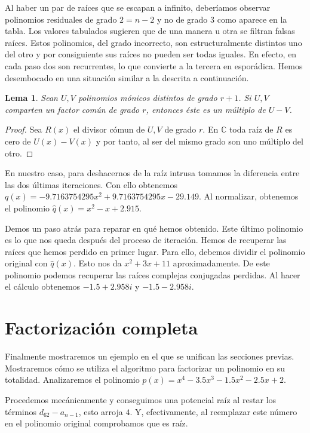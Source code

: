 \documentclass[oneside,11pt]{book}
\theoremstyle{definition}
\theoremstyle{plain}
\newtheorem{lemma}[counter]{Lema}
\theoremstyle{remark}
\begin{document}
Al haber un par de ra\'ices que se escapan a infinito, 
deber\'iamos observar polinomios residuales de grado $2=n-2$ y no de grado $3$ como aparece en la tabla. 
Los valores tabulados sugieren que de una manera u otra se filtran falsas ra\'ices.  
Estos polinomios, del grado incorrecto, son estructuralmente distintos uno del otro y por consiguiente 
sus ra\'ices no pueden ser todas iguales. 
En efecto, en cada paso dos son recurrentes, lo que convierte a la tercera en espor\'adica. 
Hemos desembocado en una situaci\'on similar a la descrita a continuaci\'on. 

\begin{lemma}
Sean $U,V$ polinomios m\'onicos distintos de grado $r+1$. 
Si $U,V$ comparten un factor com\'un de grado $r$, entonces \'este es un m\'ultiplo de $U-V$. 
\end{lemma}
\begin{proof}
Sea $R(x)$ el divisor c\'omun de $U,V$ de grado $r$. 
En $\mathbb C$ toda ra\'iz de $R$ es cero de $U(x)-V(x)$ y por tanto, 
al ser del mismo grado son uno m\'ultiplo del otro. 
\end{proof}

En nuestro caso, para deshacernos de la ra\'iz intrusa 
tomamos la diferencia entre las dos \'ultimas iteraciones.
Con ello obtenemos $q(x)=-9.7163754295x^2+9.7163754295x-29.149$.
Al normalizar, obtenemos el polinomio $\hat{q}(x)=x^2-x+2.915$.

Demos un paso atr\'as para reparar en qu\'e hemos obtenido.
Este \'ultimo polinomio es lo que nos queda despu\'es del proceso de iteraci\'on.
Hemos de recuperar las ra\'ices que hemos perdido en primer lugar.
Para ello, debemos dividir el polinomio original con $\hat{q}(x)$.
Esto nos da $x^2+3x+11$ aproximadamente. 
De este polinomio podemos recuperar las ra\'ices complejas conjugadas perdidas.
Al hacer el c\'alculo obtenemos $-1.5+2.958i$ y $-1.5-2.958i$.


\section{Factorizaci\'on completa}

Finalmente mostraremos un ejemplo en el que se unifican las secciones previas. 
Mostraremos c\'omo se utiliza el algoritmo para factorizar un polinomio en su totalidad.
Analizaremos el polinomio $p(x)= x^4-3.5x^3-1.5x^2-2.5x+2$.

Procedemos mec\'anicamente y 
conseguimos una potencial ra\'iz al restar los t\'erminos $d_{62}-a_{n-1}$, esto arroja $4$.
Y, efectivamente, al reemplazar este n\'umero en el polinomio original comprobamos que es ra\'iz.
\end{document}
